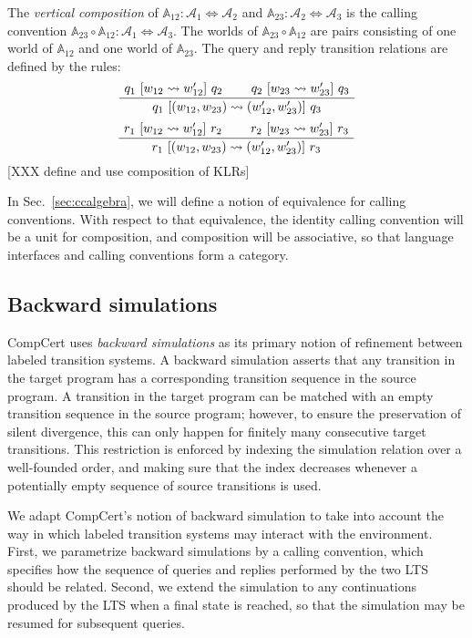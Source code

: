 \begin{definition}
The \emph{vertical composition} of
$\mathbb{A}_{12} : \mathcal{A}_1 \Leftrightarrow \mathcal{A}_2$ and
$\mathbb{A}_{23} : \mathcal{A}_2 \Leftrightarrow \mathcal{A}_3$
is the calling convention
$\mathbb{A}_{23} \circ \mathbb{A}_{12} :
 \mathcal{A}_1 \Leftrightarrow \mathcal{A}_3$.
The worlds of $\mathbb{A}_{23} \circ \mathbb{A}_{12}$
are pairs consisting of
one world of $\mathbb{A}_{12}$ and
one world of $\mathbb{A}_{23}$.
The query and reply transition relations are defined
by the rules:
\[
  \AxiomC{$q_1 \ifr{w_{12} \leadsto w_{12}'} q_2$}
  \AxiomC{$q_2 \ifr{w_{23} \leadsto w_{23}'} q_3$}
  \BinaryInfC{$q_1 \ifr{(w_{12}, w_{23}) \leadsto (w_{12}', w_{23}')} q_3$}
  \DisplayProof
\]
\[
  \AxiomC{$r_1 \ifr{w_{12} \leadsto w_{12}'} r_2$}
  \AxiomC{$r_2 \ifr{w_{23} \leadsto w_{23}'} r_3$}
  \BinaryInfC{$r_1 \ifr{(w_{12}, w_{23}) \leadsto (w_{12}', w_{23}')} r_3$}
  \DisplayProof
\]
[XXX define and use composition of KLRs]
\end{definition}

In Sec.~\ref{sec:ccalgebra},
we will define a notion of equivalence for calling conventions.
With respect to that equivalence,
the identity calling convention will be a unit for composition,
and composition will be associative,
so that language interfaces and calling conventions
form a category.


\subsection{Backward simulations} %

CompCert uses \emph{backward simulations}
as its primary notion of refinement between labeled transition systems.
A backward simulation asserts that any transition in the target program
has a corresponding transition sequence in the source program.
A transition in the target program can be matched with
an empty transition sequence in the source program;
however, to ensure the preservation of silent divergence,
this can only happen for finitely many consecutive target transitions.
This restriction is enforced by indexing the simulation relation
over a well-founded order,
and making sure that the index decreases
whenever a potentially empty sequence of source transitions is used.

We adapt CompCert's notion of backward simulation
to take into account the way in which labeled transition systems
may interact with the environment.
First,
we parametrize backward simulations by a calling convention,
which specifies how the sequence of queries and replies
performed by the two LTS should be related.
Second,
we extend the simulation to any continuations
produced by the LTS when a final state is reached,
so that the simulation may be resumed for subsequent queries.

